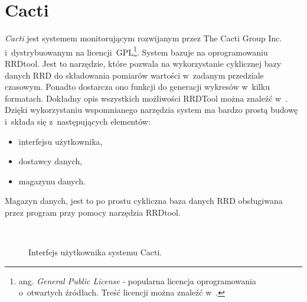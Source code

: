 \section[Cacti][Cacti]{Cacti}

{\em Cacti}\cite{www:Cacti} jest systemem monitorującym rozwijanym przez
The Cacti Group Inc. i~dystrybuowanym na licencji~GPL\footnote{
  ang. {\em General Public License} - popularna licencja
  oprogramowania o~otwartych źródłach. Treść licencji można znaleźć
  w~\cite{www:GPLv2}.}. System bazuje na oprogramowaniu
\mbox{RRDtool}\cite{www:RRDtool}. Jest to narzędzie, które pozwala na
wykorzystanie cyklicznej bazy danych RRD do składowania pomiarów
wartości w~zadanym przedziale czasowym. Ponadto dostarcza ono funkcji
do generacji wykresów w~kilku formatach. Dokładny opis wszystkich
możliwości RRDTool można znaleźć w~\cite{www:RRDtool}. Dzięki
wykorzystaniu wspomnianego narzędzia system ma bardzo prostą budowę
i~składa się z~następujących elementów:

\begin{itemize}
\item interfejsu użytkownika,
\item dostawcy danych,
\item magazynu danych.
\end{itemize}

Magazyn danych, jest to po prostu cykliczna baza danych RRD
obsługiwana przez program przy pomocy narzędzia RRDtool.

\begin{figure}[h]
\label{fig:CactiInterface}
\caption{Interfejs użytkownika systemu Cacti.}
\begin{center}
\\[0.1cm]
\end{center}
\end{figure}

